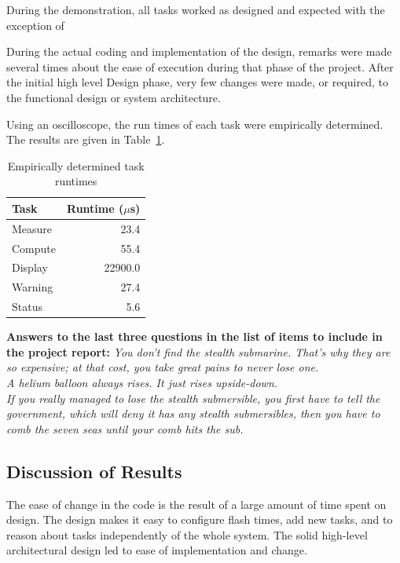 \documentclass[12pt]{article} %
\begin{document}
    During the demonstration, all tasks worked as designed and expected with the exception of

    During the actual coding and implementation of the design, remarks were
    made several times about the ease of execution during that phase of the
    project. After the initial high level Design phase, very few changes were
    made, or required, to the functional design or system architecture.

    Using an oscilloscope, the run times of each task were empirically
    determined. The results are given in Table~\ref{tab:taskRuntimes}.

    \begin{table}[h]
      \centering
      \begin{tabular}{|l|r|} 
	\hline
	Task & Runtime ($\mu$s) \\ \hline
	Measure & 23.4 \\ \hline
	Compute & 55.4 \\ \hline
	Display & 22900.0 \\ \hline
	Warning & 27.4 \\ \hline
	Status & 5.6 \\ \hline
      \end{tabular}
      \caption{Empirically determined task runtimes}
      \label{tab:taskRuntimes}
    \end{table}

    \textbf{Answers to the last three questions in the list of items to include
    in the project report:}
    \emph{You don't find the stealth submarine. That's why they are so expensive; at that cost, you take great pains to never lose one.\\  A helium balloon always rises. It just rises upside-down. \\ If you really managed to lose the stealth submersible, you first have to tell the government, which will deny it has any stealth submersibles, then you have to comb the seven seas until your comb hits the sub.}

    \subsection{Discussion of Results}
    The ease of change in the code is the result of a large amount of time spent on
    design. The design makes it easy to configure flash times, add new tasks, and
    to reason about tasks independently of the whole system. The solid high-level
    architectural design led to ease of implementation and change.
\end{document}
